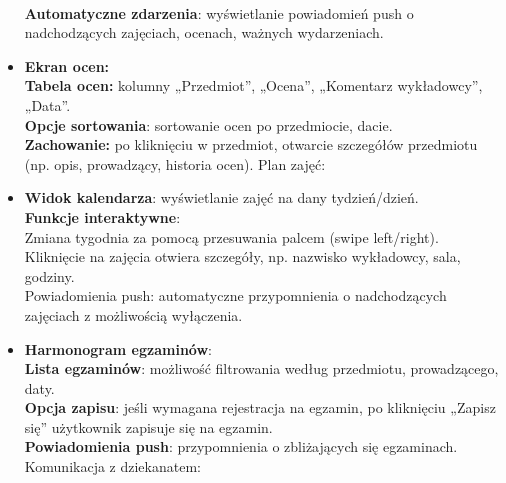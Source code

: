 \begin{itemize}
            \\\textbf{Automatyczne zdarzenia}: wyświetlanie powiadomień push o nadchodzących zajęciach, ocenach, ważnych wydarzeniach.
      \item \textbf{Ekran ocen:}
            \\\textbf{Tabela ocen:} kolumny „Przedmiot”, „Ocena”, „Komentarz wykładowcy”, „Data”.
            \\\textbf{Opcje sortowania}: sortowanie ocen po przedmiocie, dacie.
            \\\textbf{Zachowanie:} po kliknięciu w przedmiot, otwarcie szczegółów przedmiotu (np. opis, prowadzący, historia ocen).
            Plan zajęć:

      \item \textbf{Widok kalendarza}: wyświetlanie zajęć na dany tydzień/dzień.
            \\\textbf{Funkcje interaktywne}:
            \\Zmiana tygodnia za pomocą przesuwania palcem (swipe left/right).
            \\Kliknięcie na zajęcia otwiera szczegóły, np. nazwisko wykładowcy, sala, godziny.
            \\Powiadomienia push: automatyczne przypomnienia o nadchodzących zajęciach z możliwością wyłączenia.

      \item \textbf{Harmonogram egzaminów}:
            \\\textbf{Lista egzaminów}: możliwość filtrowania według przedmiotu, prowadzącego, daty.
            \\\textbf{Opcja zapisu}: jeśli wymagana rejestracja na egzamin, po kliknięciu „Zapisz się” użytkownik zapisuje się na egzamin.
            \\\textbf{Powiadomienia push}: przypomnienia o zbliżających się egzaminach.
            Komunikacja z dziekanatem:


\end{itemize}

